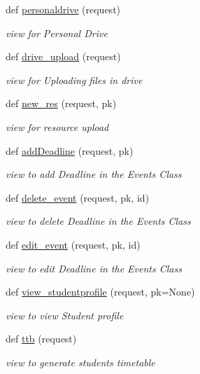 \begin{DoxyCompactItemize}
def \hyperlink{namespaceviews_a3921bace5e2cb983863a5866258f6b25}{personaldrive} (request)
\begin{DoxyCompactList}\small\item\em view for Personal Drive \end{DoxyCompactList}\item 
def \hyperlink{namespaceviews_ad3c264466e53580d0f88b2d68570b6bc}{drive\+\_\+upload} (request)
\begin{DoxyCompactList}\small\item\em view for Uploading files in drive \end{DoxyCompactList}\item 
def \hyperlink{namespaceviews_a01e7075262a8cb4ea67ff3890f5e30ee}{new\+\_\+res} (request, pk)
\begin{DoxyCompactList}\small\item\em view for resource upload \end{DoxyCompactList}\item 
def \hyperlink{namespaceviews_a9018c64738dc1996ca5af514d7a8bd44}{add\+Deadline} (request, pk)
\begin{DoxyCompactList}\small\item\em view to add Deadline in the Events Class \end{DoxyCompactList}\item 
def \hyperlink{namespaceviews_ad0e0662021d321e76ef8bff249d629d8}{delete\+\_\+event} (request, pk, id)
\begin{DoxyCompactList}\small\item\em view to delete Deadline in the Events Class \end{DoxyCompactList}\item 
def \hyperlink{namespaceviews_ac220993976d889bf433fbeee444ea1bc}{edit\+\_\+event} (request, pk, id)
\begin{DoxyCompactList}\small\item\em view to edit Deadline in the Events Class \end{DoxyCompactList}\item 
def \hyperlink{namespaceviews_af3cc38b80230fcde8ef7a49b438e156c}{view\+\_\+studentprofile} (request, pk=None)
\begin{DoxyCompactList}\small\item\em view to view Student profile \end{DoxyCompactList}\item 
def \hyperlink{namespaceviews_a76a825b4e0883320708385f1182bc6e0}{ttb} (request)
\begin{DoxyCompactList}\small\item\em view to generate student\textquotesingle{}s timetable \end{DoxyCompactList}\item 

\end{DoxyCompactItemize}
